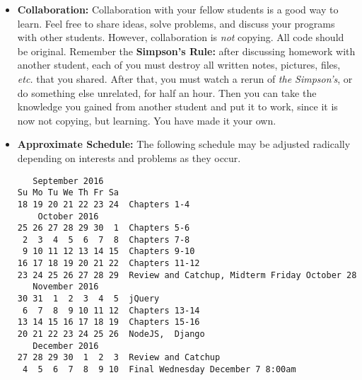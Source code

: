 \documentclass{article}
\begin{document}
\begin{itemize}
\item {\bf Collaboration:} Collaboration with your fellow students is
  a good way to learn.  Feel free to share ideas, solve problems, and
  discuss your programs with other students.  However, collaboration
  is {\em not} copying.  All code should be original.  Remember the
  {\bf Simpson's Rule:} after discussing homework with another
  student, each of you must destroy all written notes, pictures,
  files, {\em etc.} that you shared.  After that, you must watch a
  rerun of {\em the Simpson's}, or do something else unrelated, for
  half an hour.  Then you can take the knowledge you gained from
  another student and put it to work, since it is now not copying, but
  learning.  You have made it your own.

\item
{\bf Approximate Schedule:} The following schedule may be adjusted
radically depending on interests and problems as they occur.  


\begin{verbatim}
   September 2016     
Su Mo Tu We Th Fr Sa  
18 19 20 21 22 23 24  Chapters 1-4
    October 2016      
25 26 27 28 29 30  1  Chapters 5-6
 2  3  4  5  6  7  8  Chapters 7-8
 9 10 11 12 13 14 15  Chapters 9-10
16 17 18 19 20 21 22  Chapters 11-12
23 24 25 26 27 28 29  Review and Catchup, Midterm Friday October 28
   November 2016      
30 31  1  2  3  4  5  jQuery
 6  7  8  9 10 11 12  Chapters 13-14
13 14 15 16 17 18 19  Chapters 15-16
20 21 22 23 24 25 26  NodeJS,  Django
   December 2016      
27 28 29 30  1  2  3  Review and Catchup
 4  5  6  7  8  9 10  Final Wednesday December 7 8:00am
\end{verbatim}
\end{itemize}
\end{document}
